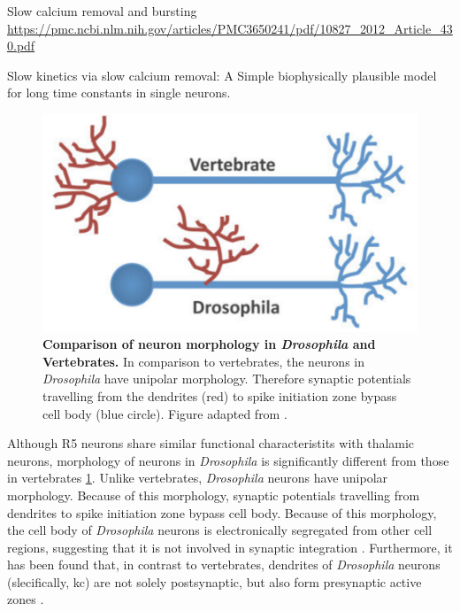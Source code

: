 \documentclass[../main.tex]{subfiles}
\begin{document}
Slow calcium removal and bursting \url{https://pmc.ncbi.nlm.nih.gov/articles/PMC3650241/pdf/10827_2012_Article_430.pdf}

Slow kinetics via slow calcium removal: A Simple biophysically plausible model for long time constants in single neurons.

\begin{figure}[!t]
    \centering
    \includegraphics[width=0.55\linewidth]{../img/modeling_r5/examples/drosophila_neuron_morphology.png}
    \caption[Neuron morphology in \textit{Drosophila} and Vertebrates]{
        \textbf{Comparison of neuron morphology in \textit{Drosophila} and Vertebrates.}
        In comparison to vertebrates,
        the neurons in \textit{Drosophila} have unipolar morphology. Therefore synaptic potentials
        travelling from the dendrites (red) to spike initiation zone bypass cell body
        (blue circle). Figure adapted from \parencite{spindlerBazookaMediatesSecondary2011}.
    }
    \label{fig:morphology_drosphila_vs_mammalian}
\end{figure}

Although R5 neurons share similar functional characteristits with thalamic neurons,
morphology of neurons in \textit{Drosophila} is significantly different from those in vertebrates
\ref{fig:morphology_drosphila_vs_mammalian}. 
Unlike vertebrates, \textit{Drosophila} neurons have unipolar morphology. Because of this morphology,
synaptic potentials travelling from dendrites to spike initiation zone bypass cell body.
Because of this morphology, the cell body of \textit{Drosophila} neurons is
electronically segregated from other cell regions, suggesting that it is not involved
in synaptic integration \parencite{gouwensSignalPropagationDrosophila2009,tuthillLessonsCompartmentalModel2009}.
Furthermore, it has been found that, in contrast to vertebrates, dendrites of
\textit{Drosophila} neurons (slecifically, \gls{kc}) are not solely postsynaptic, but
also form presynaptic active zones \parencite{christiansenPresynapsesKenyonCell2011}.


\end{document}
